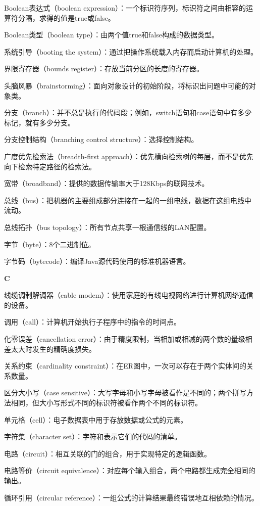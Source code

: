 Boolean表达式（boolean expression）：一个标识符序列，标识符之间由相容的运算符分隔，求得的值是true或false。

Boolean类型（boolean type）：由两个值true和false构成的数据类型。

系统引导（booting the system）：通过把操作系统载入内存而启动计算机的处理。

界限寄存器（bounds register）：存放当前分区的长度的寄存器。

头脑风暴（brainstorming）：面向对象设计的初始阶段，将标识出问题中可能的对象类。

分支（branch）：并不总是执行的代码段；例如，switch语句和case语句中有多少标记，就有多少分支。

分支控制结构（branching control structure）：选择控制结构。

广度优先检索法（breadth-first approach）：优先横向检索树的每层，而不是优先向下检索特定路径的检索法。

宽带（broadband）：提供的数据传输率大于128Kbps的联网技术。

总线（bus）：把机器的主要组成部分连接在一起的一组电线，数据在这组电线中流动。

总线拓扑（bus topology）：所有节点共享一根通信线的LAN配置。

字节（byte）：8个二进制位。

字节码（bytecode）：编译Java源代码使用的标准机器语言。

\textbf{C}

线缆调制解调器（cable modem）：使用家庭的有线电视网络进行计算机网络通信的设备。

调用（call）：计算机开始执行子程序中的指令的时间点。

化零误差（cancellation error）：由于精度限制，当相加或相减的两个数的量级相差太大时发生的精确度损失。

关系约束（cardinality constraint）：在ER图中，一次可以存在于两个实体间的关系数量。

区分大小写（case sensitive）：大写字母和小写字母被看作是不同的；两个拼写方法相同，但大小写形式不同的标识符被看作两个不同的标识符。

单元格（cell）：电子数据表中用于存放数据或公式的元素。

字符集（character set）：字符和表示它们的代码的清单。

电路（circuit）：相互关联的门的组合，用于实现特定的逻辑函数。

电路等价（circuit equivalence）：对应每个输入组合，两个电路都生成完全相同的输出。

循环引用（circular reference）：一组公式的计算结果最终错误地互相依赖的情况。

